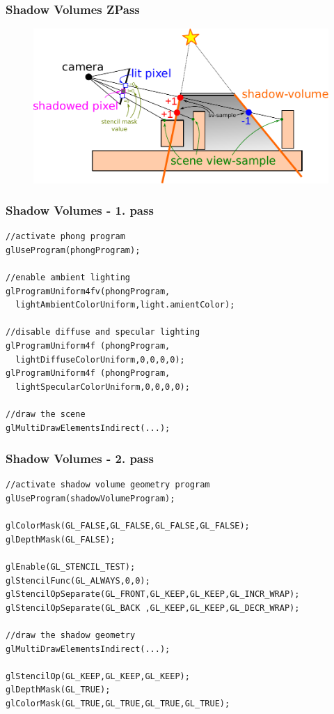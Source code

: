 \begin{frame}\frametitle{Shadow Volumes ZPass}
  \begin{figure}[h]
    \includegraphics[width=11.5cm,keepaspectratio]{pics/shadows/shadowVolumes/ZPass}
  \end{figure}
\end{frame}

\begin{frame}[fragile]\frametitle{Shadow Volumes - 1. pass}

  \begin{verbatim}
//activate phong program
glUseProgram(phongProgram);

//enable ambient lighting
glProgramUniform4fv(phongProgram,
  lightAmbientColorUniform,light.amientColor);

//disable diffuse and specular lighting
glProgramUniform4f (phongProgram,
  lightDiffuseColorUniform,0,0,0,0);
glProgramUniform4f (phongProgram,
  lightSpecularColorUniform,0,0,0,0);

//draw the scene
glMultiDrawElementsIndirect(...);
  \end{verbatim}
\end{frame}

\begin{frame}[fragile]\frametitle{Shadow Volumes - 2. pass}

  \begin{verbatim}
//activate shadow volume geometry program
glUseProgram(shadowVolumeProgram);

glColorMask(GL_FALSE,GL_FALSE,GL_FALSE,GL_FALSE);
glDepthMask(GL_FALSE);

glEnable(GL_STENCIL_TEST);
glStencilFunc(GL_ALWAYS,0,0);
glStencilOpSeparate(GL_FRONT,GL_KEEP,GL_KEEP,GL_INCR_WRAP);
glStencilOpSeparate(GL_BACK ,GL_KEEP,GL_KEEP,GL_DECR_WRAP);

//draw the shadow geometry
glMultiDrawElementsIndirect(...);

glStencilOp(GL_KEEP,GL_KEEP,GL_KEEP);
glDepthMask(GL_TRUE);
glColorMask(GL_TRUE,GL_TRUE,GL_TRUE,GL_TRUE);
  \end{verbatim}
\end{frame}

